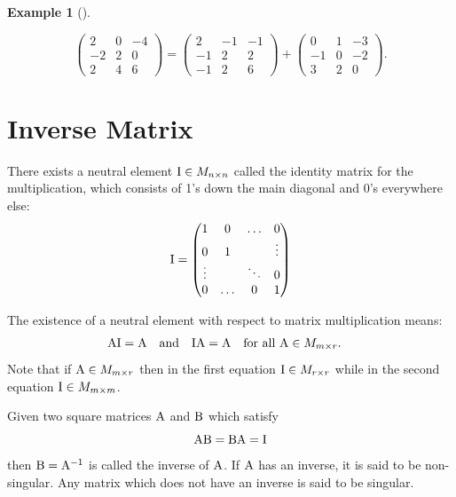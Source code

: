 \documentclass[
  a4paper,
  DIV=11,
  numbers=noendperiod,
  oneside]{scrreprt}
\theoremstyle{definition}
\newtheorem{example}{Example}[chapter]
\theoremstyle{remark}
\newenvironment{fbxSimple}[3]{\begin{tcolorbox}[enhanced, breakable,%
attach boxed title to top*={xshift=1.4pt},
boxed title style={boxrule=0.0mm, fuzzy shadow={1pt}{-1pt}{0mm}{0.1mm}{gray}, arc=.3em, rounded corners=east, sharp corners=west}, colframe=#1-color2, colbacktitle=#1-color1, colback = white, coltitle=black,  titlerule=0mm, toprule=0pt, bottomrule=.7pt, leftrule=.3em, rightrule=.7pt, outer arc=.3em,  	left=.5em, right=.5em, bottomtitle=1mm, toptitle=1mm,title=\textbf{#2}\hspace{0.5em}{#3}]}
{\end{tcolorbox}}
\begin{document}
\begin{example}[]\protect\hypertarget{exm-}{}\label{exm-}

\[\left( \begin{array}{rrr}
 2  & 0  & {-4}  \\
 {-2}  & 2  & 0  \\
 2  & 4  & 6  
\end{array}  \right) =\left(\begin{array}{rrr}
 2  & {-1}  & {-1}  \\
 {-1}  & 2  & 2  \\
 {-1}  & 2  & 6  
\end{array}  \right)+\left( \begin{array}{rrr}
 0  & 1  & {-3}  \\
 {-1}  & 0  & {-2}  \\
 3  & 2  & 0  
\end{array}  \right).\]

\end{example}

\section{Inverse Matrix}\label{inverse-matrix}

There exists a neutral element \({\rm I} \in M_{n\times n}\) called the
identity matrix for the multiplication, which consists of 1's down the
main diagonal and 0's everywhere else: \[{\rm I} =  \begin{pmatrix}
          1 &0  &\ldots   &0  \\
          0 &1  &   &\vdots   \\
           \vdots  &   & \ddots  &0 \\
          0   &  \ldots &  0&1
        \end{pmatrix}\]

The existence of a neutral element with respect to matrix multiplication
means: \[\begin{aligned}
{\rm A} {\rm I} & = {\rm A}  \quad \text{and} \quad  {\rm I}  {\rm A} = {\rm A}  \quad \text{for all} \ {\rm A} \in M_ {m\times r}.
\end{aligned}\] Note that if \({\rm A} \in M_{m\times r}\) then in the
first equation \({\rm I}\in M_{r\times r}\) while in the second equation
\({\rm I}\in M_{m\times m}\).

\label{inverse-of-a-matrix}
\begin{fbxSimple}{Definition}{Definition 3.9: }{Inverse of a matrix}
\label{inverse-of-a-matrix}
Given two square matrices \({\rm A}\) and \({\rm B}\) which satisfy
\[{\rm A} {\rm B} = {\rm B}  {\rm A} = {\rm I}\] then
\({\rm B} = {\rm A}^{-1}\) is called the inverse of \({\rm A}\). If
\({\rm A}\) has an inverse, it is said to be non-singular. Any matrix
which does not have an inverse is said to be singular.

\end{fbxSimple}
\end{document}
